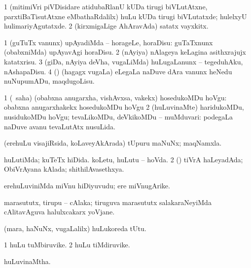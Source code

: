 \begin{center}
\noindent
\gl{\pagu}
\expl{}
\bmng
\bnum
\num{1}  (mitimiVri piVDisidare atidubaRlanU kUDa tirugi biVLutAtxne, parxtiBaTisutAtxne eMbathaRdalilx) huLu kUDa tirugi biVLutatxde; hulelxyU hulimariyAgutatxde. 
\num{2}  (kirxmigaLige AhAravAda) satatx vayxkitx. 
\enum
\emng
\eentry

\bentry
{} 
\gl{\sakirx}
\expl{}
\bmng
\bnum
\num{1} (guTuTx \mo vanunx) upAyadiMda -- horageLe, horaDisu:  guTaTxnunx (obabxniMda) upAyavAgi horaDisu. 
\num{2} (nAyiya) nAlageya keLagina asithxrajujx katatxrisu. 
\num{3} (giDa, nAyiya deVha, \mo vugaLiMda) huLugaLanunx -- tegeduhAku, nAshapaDisu. 
\num{4} (\nw) (hagagx \mo vugaLa) eLegaLa naDuve dAra \mo vanunx heNedu nuNupumADu, maqdugoLisu. 
\enum
\emng

\noindent
\gl{\akirx}
\expl{}
\bmng
\bnum
\num{1} (\AtAmx\ saha) (obabxna anugarxha, vishAvxsa, \mo vakekx) hosedukoMDu hoVgu:  obabxna anugarxhakekx hosedukoMDu hoVgu 
\num{2} (huLuvinaMte) haridukoMDu, nusidukoMDu hoVgu; tevaLikoMDu, deVkikoMDu -- muMduvari:  podegaLa naDuve avanu tevaLutAtx nusuLida. 
\enum
\emng
\eentry

\bentry
{} 
\gl{\nA}
\expl{}
\bmng
(erehuLu visajiRsida, koLaveyAkArada) tUpuru maNuNx; maqNamxla. 
\emng
\eentry

\bentry
{} 
\gl{\gu}
\expl{}
\bmng
\bnum
{} 
\banum
{} huLutiMda; kuTeTx hiDida. 
 koLetu, huLutu -- hoVda. 
\eanum
\numie
\num{2} (\rUpa) tiVrA haLeyadAda; ObiVrAyana kAlada; shithilAvasethxya. 
\enum
\emng
\eentry

\bentry
{} 
\gl{\nA}
\expl{}
\bmng
erehuLuviniMda miVnu hiDiyuvudu; ere miVnugArike. 
\emng
\eentry

\bentry
{} 
\gl{\nA}
\expl{}
\bmng
marasututx, tirupu -- cAlaka; tiruguva marasututx salakaraNeyiMda cAlitavAguva halulxcakarx yoVjane. 
\emng
\eentry

\bentry
{} 
\gl{\nA}
\expl{}
\bmng
(mara, haNuNx, \mo vugaLalilx) huLukoreda tUtu. 
\emng
\eentry

\bentry
{} 
\gl{\nA}
\expl{}
\bmng
\bnum
\num{1} huLu tuMbiruvike. 
\num{2} huLu tiMdiruvike. 
\enum
\emng
\eentry

\bentry
{} 
\gl{\gu}
\expl{}
\bmng
huLuvinaMtha. 
\emng
\eentry


\end{center}
